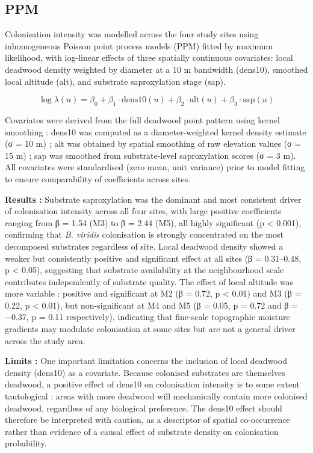 \documentclass[
  letterpaper,
  DIV=11,
  numbers=noendperiod]{scrartcl}
\begin{document}
\subsection{PPM}\label{ppm}

Colonisation intensity was modelled across the four study sites using
inhomogeneous Poisson point process models (PPM) fitted by maximum
likelihood, with log-linear effects of three spatially continuous
covariates: local deadwood density weighted by diameter at a 10 m
bandwidth (dens10), smoothed local altitude (alt), and substrate
saproxylation stage (sap).

\[\log \lambda(u) = \beta_0 + \beta_1 \cdot \text{dens10}(u) + \beta_2 \cdot \text{alt}(u) + \beta_3 \cdot \text{sap}(u)\]

Covariates were derived from the full deadwood point pattern using
kernel smoothing : dens10 was computed as a diameter-weighted kernel
density estimate (σ = 10 m) ; alt was obtained by spatial smoothing of
raw elevation values (σ = 15 m) ; sap was smoothed from substrate-level
saproxylation scores (σ = 3 m). All covariates were standardised (zero
mean, unit variance) prior to model fitting to ensure comparability of
coefficients across sites.

\textbf{Results :} Substrate saproxylation was the dominant and most
consistent driver of colonisation intensity across all four sites, with
large positive coefficients ranging from β = 1.54 (M3) to β = 2.44 (M5),
all highly significant (p \textless{} 0.001), confirming that \emph{B.
viridis} colonisation is strongly concentrated on the most decomposed
substrates regardless of site. Local deadwood density showed a weaker
but consistently positive and significant effect at all sites (β =
0.31--0.48, p \textless{} 0.05), suggesting that substrate availability
at the neighbourhood scale contributes independently of substrate
quality. The effect of local altitude was more variable : positive and
significant at M2 (β = 0.72, p \textless{} 0.01) and M3 (β = 0.22, p
\textless{} 0.01), but non-significant at M4 and M5 (β = 0.05, p = 0.72
and β = −0.37, p = 0.11 respectively), indicating that fine-scale
topographic moisture gradients may modulate colonisation at some sites
but are not a general driver across the study area.

\textbf{Limits :} One important limitation concerns the inclusion of
local deadwood density (dens10) as a covariate. Because colonised
substrates are themselves deadwood, a positive effect of dens10 on
colonisation intensity is to some extent tautological : areas with more
deadwood will mechanically contain more colonised deadwood, regardless
of any biological preference. The dens10 effect should therefore be
interpreted with caution, as a descriptor of spatial co-occurrence
rather than evidence of a causal effect of substrate density on
colonisation probability.
\end{document}
